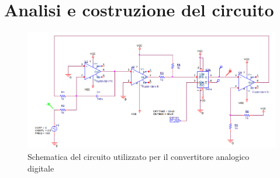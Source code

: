 \documentclass[10pt, a4paper, italian]{article}
\begin{document}
\section{Analisi e costruzione del circuito}\label{sec: IC}
\begin{figure}[htbp]
    \centering
	\includegraphics[width=\textwidth]{schem}
    \caption{Schematica del circuito utilizzato per il convertitore analogico digitale}
\end{figure}
\end{document}
